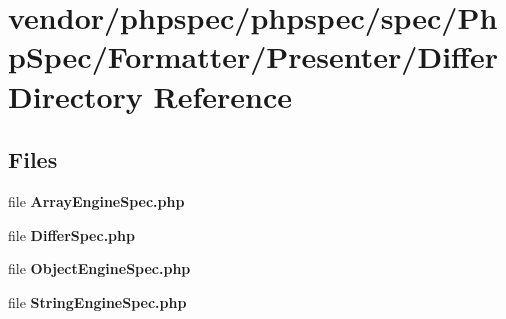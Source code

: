 \section{vendor/phpspec/phpspec/spec/\+Php\+Spec/\+Formatter/\+Presenter/\+Differ Directory Reference}
\label{dir_2bcbf85a20f1f3b6346088028f2df5df}
\subsection*{Files}
\begin{DoxyCompactItemize}
\item 
file {\bf Array\+Engine\+Spec.\+php}
\item 
file {\bf Differ\+Spec.\+php}
\item 
file {\bf Object\+Engine\+Spec.\+php}
\item 
file {\bf String\+Engine\+Spec.\+php}
\end{DoxyCompactItemize}
